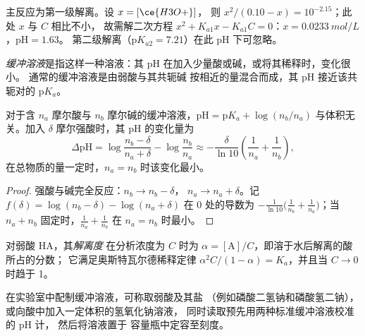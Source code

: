 \begin{example}\label{ex:b1:predominant-reaction:h3po4}
主反应为第一级解离。设 $x = [\ce{H3O+}]$，
则 $x^2/(0.10 - x) = 10^{-2.15}$；此处 $x$ 与 $C$ 相比不小，
故需解二次方程 $x^2 + K_{a1}x - K_{a1}C = 0$：$x =
\qty{0.0233}{mol/L}$，$\mathrm{pH} = 1.63$。
第二级解离（$\mathrm{p}K_{a2} = 7.21$）在此 pH 下可忽略。
\end{example}

\begin{definition}[缓冲溶液]\label{def:b1:predominant-reaction:buffer}
\emph{缓冲溶液}是指这样一种溶液：其 pH
在加入少量酸或碱，或将其稀释时，变化很小。
通常的缓冲溶液是由弱酸与其共轭碱
按相近的量混合而成，其 pH 接近该共轭对的
$\mathrm{p}K_a$。
\end{definition}

\begin{proposition}[缓冲溶液为何能抵抗酸碱]\label{prop:b1:predominant-reaction:buffer}
对于含 $n_a$ 摩尔酸与 $n_b$ 摩尔碱的缓冲溶液，$\mathrm{pH} =
\mathrm{p}K_a + \log(n_b/n_a)$ 与体积无关。加入
$\delta$ 摩尔强酸时，其 pH 的变化量为
\[
  \Delta\mathrm{pH} = \log\frac{n_b - \delta}{n_a + \delta} - \log\frac{n_b}{n_a}
  \approx -\frac{\delta}{\ln 10}\left(\frac{1}{n_a} + \frac{1}{n_b}\right),
\]
在总物质的量一定时，$n_a = n_b$ 时该变化最小。
\end{proposition}

\begin{proof}
强酸与碱完全反应：$n_b \to n_b - \delta$，
$n_a \to n_a + \delta$。记 $f(\delta) = \log(n_b - \delta) -
\log(n_a + \delta)$ 在 0 处的导数为 $-\frac{1}{\ln10}\big(\frac{1}{n_b} +
\frac{1}{n_a}\big)$；当 $n_a + n_b$ 固定时，$\frac1{n_a} + \frac1{n_b}$ 在
$n_a = n_b$ 时最小。
\end{proof}

\begin{definition}[解离度]\label{def:b1:predominant-reaction:dissociation}
对弱酸 HA，其\emph{解离度}
在分析浓度为 $C$ 时为 $\alpha = [\mathrm{A}]/C$，即溶于水后解离的酸所占的分数；
它满足奥斯特瓦尔德稀释定律
$\alpha^2C/(1 - \alpha) = K_a$，并且当 $C \to 0$ 时趋于 1。
\end{definition}

\begin{inthelab}[配制缓冲溶液]
在实验室中配制缓冲溶液，可称取弱酸及其盐
（例如磷酸二氢钠和磷酸氢二钠），
或向酸中加入一定体积的氢氧化钠溶液，
同时读取预先用两种标准缓冲溶液校准的 pH 计，
然后将溶液置于
容量瓶中定容至刻度。
\end{inthelab}

